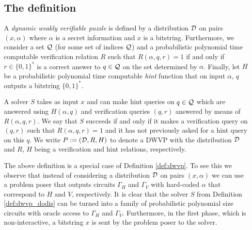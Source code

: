 \subsection{The definition}
\begin{definition}
  \label{def:dwvp_dodis}
  A \textit{dynamic weakly verifiable puzzle} is defined by a distribution $\mathcal{D}$ on pairs $(x, \alpha)$ where
  $\alpha$ is a secret information and $x$ is a bitstring.
  Furthermore, we consider a set $\mathcal{Q}$ (for some set of indices $\mathcal{Q}$) and a probabilistic polynomial time computable verification relation $R$ such that
  $R(\alpha, q, r) = 1$ if and only if $r \in \{0,1\}^{*}$ is a correct answer to $q \in \mathcal{Q}$
  on the set determined by $\alpha$. Finally, let $H$ be a probabilistic polynomial time computable \textit{hint} function
  that on input $\alpha$, $q$ outputs a bitstring $\{0,1\}^{*}$.

  A solver $S$ takes as input $x$ and can make hint queries on $q \in \mathcal{Q}$ which are answered using $H(\alpha, q)$ and verification
  queries $(q,r)$ answered by means of $R(\alpha, q, r)$.
  We say that $S$ succeeds if and only if it makes a verification query on $(q,r)$ such that
  $R(\alpha,q,r) = 1$ and it has not previously asked for a hint query on this $q$.
  We write $P := (\mathcal{D}, R, H)$ to denote a DWVP with the distribution $\mathcal{D}$ and $R$, $H$ being a verification and hint relations, respectively.
\end{definition}
%
The above definition is a special case of Definition \ref{def:dwvp}.
To see this we observe that instead of considering a distribution $\mathcal{D}$ on pairs $(x,\alpha)$
we can use a problem poser that outputs circuits $\Gamma_H$ and $\Gamma_V$ with hard-coded $\alpha$ that correspond to $H$ and $V$, respectively.
It is clear that the solver $S$ from Definition \ref{def:dwvp_dodis} can be turned into a family of probabilistic polynomial size circuits
with oracle access to $\Gamma_H$ and $\Gamma_V$. Furthermore, in the first phase, which is non-interactive,
a bitstring $x$ is sent by the problem poser to the solver.

